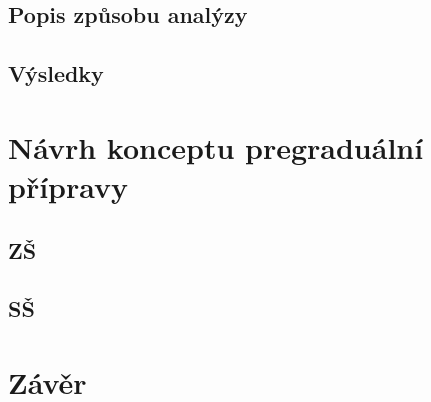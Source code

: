 \documentclass[FP,DP]{tulthesis}
\newcommand{\chapquote}[3]{\begin{quotation} \textit{#1} \end{quotation} \begin{flushright} - #2, \textit{#3}\end{flushright} }
\begin{document}
\section{Popis způsobu analýzy}
\section{Výsledky}
\chapter{Návrh konceptu pregraduální přípravy}
\section{ZŠ}
\section{SŠ}
\chapter{Závěr}
\textcolor{gray}{\Blindtext}





\end{document}
